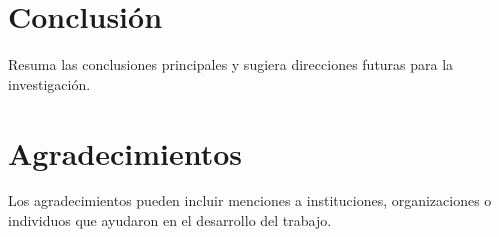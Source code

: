 \documentclass[conference]{IEEEtran}
\begin{document}
\section{Conclusión}
Resuma las conclusiones principales y sugiera direcciones futuras para la investigación.

\section*{Agradecimientos}
Los agradecimientos pueden incluir menciones a instituciones, organizaciones o individuos que ayudaron en el desarrollo del trabajo.



\end{document}
